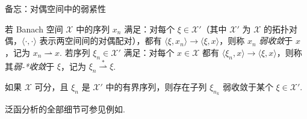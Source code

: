\begin{sourcebox}{备忘：对偶空间中的弱紧性}\label{box:1.2}
\begin{definition*}
若 Banach 空间 $\mathscr X$ 中的序列 $x_n$ 满足：对每个 $\xi\in\mathscr X'$（其中 $\mathscr X'$ 为 $\mathscr X$ 的拓扑对偶，$\langle\cdot,\cdot\rangle$ 表示两空间间的对偶配对），都有 $\langle\xi,x_n\rangle\to\langle\xi,x\rangle$，则称 $x_n$ \emph{弱收敛}于 $x$，记为 $x_n\rightharpoonup x$. 若序列 $\xi_n\in\mathscr X'$ 满足：对每个 $x\in\mathscr X$ 都有 $\langle\xi_n,x\rangle\to\langle\xi,x\rangle$，则称其\emph{弱-*收敛}于 $\xi$，记为 $\xi_n\overset{*}{\rightharpoonup}\xi$.
\end{definition*}

\begin{theorem*}
如果 $\mathscr X$ 可分，且 $\xi_n$ 是 $\mathscr X'$ 中的有界序列，则存在子列 $\xi_{n_k}$ 弱收敛于某个 $\xi\in\mathscr X'$.
\end{theorem*}

泛函分析的全部细节可参见例如\cite{b90}.
\end{sourcebox}

